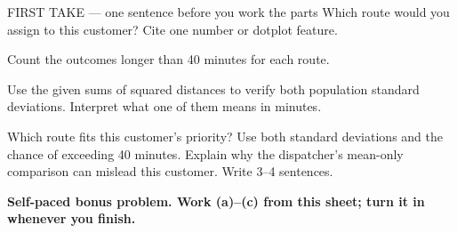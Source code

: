 \documentclass[14pt]{extarticle}
\begin{document}
\begin{firsttakebox}{FIRST TAKE --- one sentence before you work the parts}
Which route would you assign to this customer? Cite one number or dotplot feature.
\end{firsttakebox}

\begin{description}[leftmargin=1.15in, labelwidth=1in, itemsep=2pt, topsep=2pt]
  \item[\dokbadge{1}~(a)] Count the outcomes longer than 40 minutes for each route.
  \item[\dokbadge{2}~(b)] Use the given sums of squared distances to verify both population standard deviations. Interpret what one of them means in minutes.
  \item[\dokbadge{3}~(c)] Which route fits this customer's priority? Use both standard deviations and the chance of exceeding 40 minutes. Explain why the dispatcher's mean-only comparison can mislead this customer. Write 3--4 sentences.
\end{description}

\vfill
\textbf{Self-paced bonus problem. Work (a)--(c) from this sheet; turn it in whenever you finish.}
\end{document}
